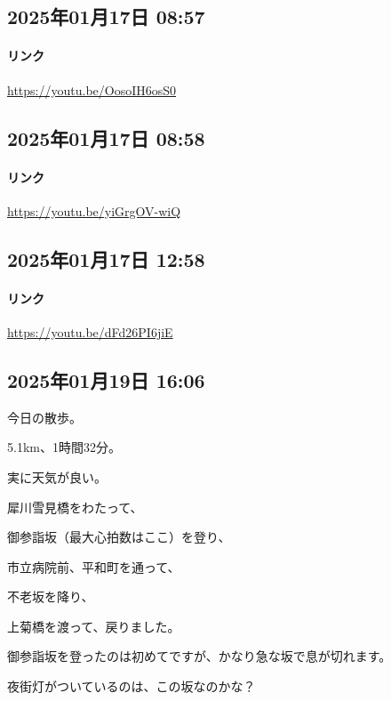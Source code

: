 \subsection*{2025年01月17日 08:57}

\paragraph{リンク}
\url{https://youtu.be/OosoIH6osS0}

\subsection*{2025年01月17日 08:58}

\paragraph{リンク}
\url{https://youtu.be/yiGrgOV-wiQ}

\subsection*{2025年01月17日 12:58}

\paragraph{リンク}
\url{https://youtu.be/dFd26PI6jiE}

\subsection*{2025年01月19日 16:06}

今日の散歩。

5.1km、1時間32分。

実に天気が良い。

犀川雪見橋をわたって、

御参詣坂（最大心拍数はここ）を登り、

市立病院前、平和町を通って、

不老坂を降り、

上菊橋を渡って、戻りました。

御参詣坂を登ったのは初めてですが、かなり急な坂で息が切れます。

夜街灯がついているのは、この坂なのかな？

